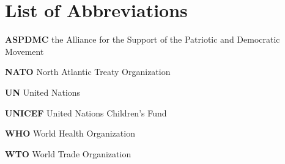 \chapter*{List of Abbreviations}

\begin{abbrv}

\item[\textbf{ASPDMC}] the Alliance for the Support of the Patriotic and Democratic Movement

\item[\textbf{NATO}] North Atlantic Treaty Organization

\item[\textbf{UN}] United Nations

\item[\textbf{UNICEF}] United Nations Children's Fund

\item[\textbf{WHO}] World Health Organization

\item[\textbf{WTO}] World Trade Organization

\end{abbrv} 
